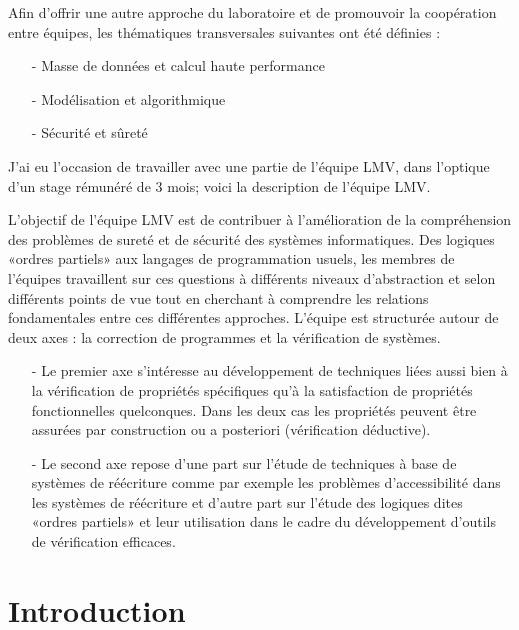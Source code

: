 \documentclass[10pt,a4paper]{article}
\begin{document}
		Afin d'offrir une autre approche du laboratoire et de promouvoir la coopération entre équipes, les thématiques transversales suivantes ont été définies :
		\begin{enumerate}
			\item[-] Masse de données et calcul haute performance
			\item[-] Modélisation et algorithmique
			\item[-] Sécurité et sûreté
		\end{enumerate}
		\medbreak
		
		J'ai eu l'occasion de travailler avec une partie de l'équipe LMV, dans l'optique d'un stage rémunéré de 3 mois; voici la description de l'équipe LMV.
		\medbreak
		
		L'objectif de l'équipe LMV est de contribuer à l'amélioration de la compréhension des problèmes de sureté et de sécurité des systèmes  informatiques. Des logiques «ordres partiels» aux langages de programmation usuels, les membres de l'équipes travaillent sur ces questions à différents niveaux d'abstraction et selon différents points de vue tout en cherchant à comprendre les relations fondamentales entre ces différentes approches. L'équipe est structurée autour de deux axes : la correction de programmes et la vérification de systèmes.
		\begin{enumerate}
			\item[-] Le premier axe s'intéresse au développement de techniques liées aussi bien à la vérification de propriétés spécifiques qu'à la satisfaction de propriétés fonctionnelles quelconques. Dans les deux cas les propriétés peuvent être assurées par construction ou a posteriori (vérification déductive).
			\item[-] Le second axe repose d'une part sur l'étude de techniques à base de systèmes de réécriture comme par exemple les problèmes d'accessibilité dans les systèmes de réécriture et d'autre part sur l'étude des logiques dites «ordres partiels» et leur utilisation dans le cadre du développement d'outils de vérification efficaces.
		\end{enumerate}
		\newpage
		
		
		
	\section{Introduction}

		
		
\end{document}
